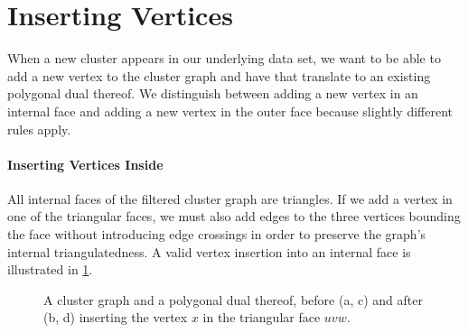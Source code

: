 \section{Inserting Vertices}
\label{sect:inserting-vertices}

When a new cluster appears in our underlying data set, we want to be able to add a new vertex to the cluster graph and have that translate to an existing polygonal dual thereof.
We distinguish between adding a new vertex in an internal face and adding a new vertex in the outer face because slightly different rules apply.



\paragraph{Inserting Vertices Inside}

All internal faces of the filtered cluster graph  are triangles.
If we add a vertex in one of the triangular faces, we must also add edges to the three vertices bounding the face without introducing edge crossings in order to preserve the graph's internal triangulatedness.
A valid vertex insertion into an internal face is illustrated in \cref{fig:insert-vertex-example-inside}.

\begin{figure}[H]
	\centering
	\quad
	\qquad
	\quad
	\caption{A cluster graph and a polygonal dual thereof, before (a, c) and after (b, d) inserting the vertex $x$ in the triangular face $uvw$.}
	\label{fig:insert-vertex-example-inside}
\end{figure}

